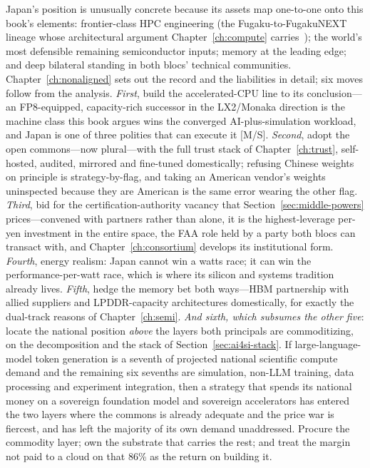 Japan's position is unusually concrete because its assets map one-to-one onto this book's elements: frontier-class HPC engineering (the Fugaku-to-FugakuNEXT lineage whose architectural argument Chapter~\ref{ch:compute} carries~\cite{dhm-long}); the world's most defensible remaining semiconductor inputs; memory at the leading edge; and deep bilateral standing in both blocs' technical communities. Chapter~\ref{ch:nonaligned} sets out the record and the liabilities in detail; six moves follow from the analysis. \emph{First}, build the accelerated-CPU line to its conclusion---an FP8-equipped, capacity-rich successor in the LX2/Monaka direction is the machine class this book argues wins the converged AI-plus-simulation workload, and Japan is one of three polities that can execute it [M/S]. \emph{Second}, adopt the open commons---now plural---with the full trust stack of Chapter~\ref{ch:trust}, self-hosted, audited, mirrored and fine-tuned domestically; refusing Chinese weights on principle is strategy-by-flag, and taking an American vendor's weights uninspected because they are American is the same error wearing the other flag. \emph{Third}, bid for the certification-authority vacancy that Section~\ref{sec:middle-powers} prices---convened with partners rather than alone, it is the highest-leverage per-yen investment in the entire space, the FAA role held by a party both blocs can transact with, and Chapter~\ref{ch:consortium} develops its institutional form. \emph{Fourth}, energy realism: Japan cannot win a watts race; it can win the performance-per-watt race, which is where its silicon and systems tradition already lives. \emph{Fifth}, hedge the memory bet both ways---HBM partnership with allied suppliers and LPDDR-capacity architectures domestically, for exactly the dual-track reasons of Chapter~\ref{ch:semi}. \emph{And sixth, which subsumes the other five}: locate the national position \emph{above} the layers both principals are commoditizing, on the decomposition and the stack of Section~\ref{sec:ai4si-stack}. If large-language-model token generation is a seventh of projected national scientific compute demand and the remaining six sevenths are simulation, non-LLM training, data processing and experiment integration, then a strategy that spends its national money on a sovereign foundation model and sovereign accelerators has entered the two layers where the commons is already adequate and the price war is fiercest, and has left the majority of its own demand unaddressed. Procure the commodity layer; own the substrate that carries the rest; and treat the margin not paid to a cloud on that 86\% as the return on building it.

